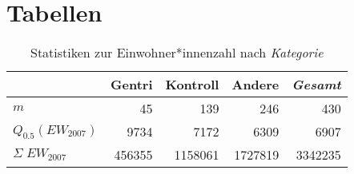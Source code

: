 \section{Tabellen}

\begin{table}[h]
\centering
\begin{tabular}{@{}lrrrr@{}}
\toprule
                                       & \multicolumn{1}{r}{{\bf Gentri}} & \multicolumn{1}{r}{{\bf Kontroll}} & \multicolumn{1}{r}{{\bf Andere}} & \multicolumn{1}{r}{{\bf \textit{Gesamt}}} \\ \midrule
$m$                                    & 45                               & 139                                & 246                              & 430                                  \\
$Q_{0.5}(EW_{2007})$                   & 9734                             & 7172                               & 6309                             & 6907                                 \\
$\Sigma\;EW_{2007}$                    & 456355                           & 1158061                            & 1727819                          & 3342235                              \\ \bottomrule
\end{tabular}
\caption{Statistiken zur Einwohner*innenzahl nach \textit{Kategorie}}\label{tab:KategorieEW}
\end{table}            
